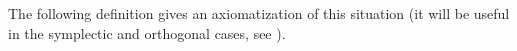 \begin{num}
%


The following definition gives an axiomatization of this situation
(it will be useful in the symplectic and orthogonal cases,
see ).
\end{num}
